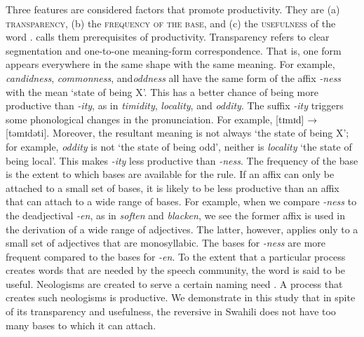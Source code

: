 \documentclass[output=paper]{langsci/langscibook}
\begin{document}
Three features are considered factors that promote productivity. They are (a) \textsc{transparency}, (b) the \textsc{frequency of the base}, and (c) the \textsc{usefulness} of the word \citep{Bauer2001,Lieber2009}. \citet{Bauer2001} calls them prerequisites of productivity. Transparency refers to clear segmentation and one-to-one meaning-form correspondence. That is, one form appears everywhere in the same shape with the same meaning. For example, \textit{candidness}, \textit{commonness}, and\textit{oddness} all have the same form of the affix \textit{{}-ness} with the mean ‘state of being X’. This has a better chance of being more productive than \textit{{}-ity}, as in \textit{timidity}, \textit{locality}, and \textit{oddity}. The suffix \textit{{}-ity} triggers some phonological changes in the pronunciation. For example, [tɪmɪd] → [təmɪdəti]. Moreover, the resultant meaning is not always ‘the state of being X’; for example, \textit{oddity} is not ‘the state of being odd’, neither is \textit{locality} ‘the state of being local’. This makes \textit{{}-ity} less productive than \textit{{}-ness}. The frequency of the base is the extent to which bases are available for the rule. If an affix can only be attached to a small set of bases, it is likely to be less productive than an affix that can attach to a wide range of bases. For example, when we compare \textit{{}-ness} to the deadjectival \textit{{}-en}, as in \textit{soften} and \textit{blacken}, we see the former affix is used in the derivation of a wide range of adjectives. The latter, however, applies only to a small set of adjectives that are monosyllabic. The bases for \textit{{}-ness} are more frequent compared to the bases for \textit{{}-en}. To the extent that a particular process creates words that are needed by the speech community, the word is said to be useful. Neologisms are created to serve a certain naming need \citep{Stekauer2005}. A process that creates such neologisms is productive. We demonstrate in this study that in spite of its transparency and usefulness, the reversive in Swahili does not have too many bases to which it can attach. 
\end{document}
